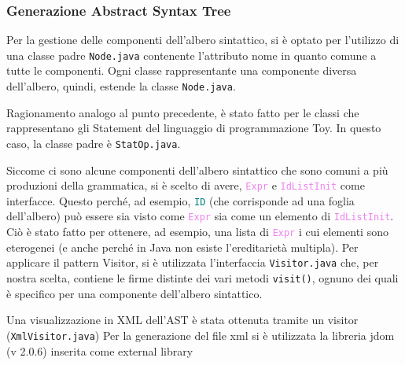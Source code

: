 \documentclass[a4paper,12pt]{article}
\newcommand\nonterm[1]{\texttt{\textcolor{violet}{#1}}}
\newcommand\term[1]{\texttt{\textcolor{teal}{#1}}}
\begin{document}
	\subsubsection{Generazione Abstract Syntax Tree}

 	Per la gestione delle componenti dell'albero sintattico, si è optato per l'utilizzo di una classe padre
	\texttt{Node.java} contenente l'attributo nome in quanto comune a tutte le componenti.
    Ogni classe rappresentante una componente diversa dell'albero, quindi, estende la classe \texttt{Node.java}.

	Ragionamento analogo al punto precedente, è stato fatto per le classi che rappresentano gli Statement del
    linguaggio di programmazione Toy. In questo caso, la classe padre è \texttt{StatOp.java}.

   Siccome ci sono alcune componenti dell'albero sintattico che sono comuni a più produzioni della grammatica,
   si è scelto di avere, \nonterm{Expr} e \nonterm{IdListInit} come interfacce. Questo perché, ad esempio, \term{ID} (che corrisponde ad
   una foglia dell'albero) può essere sia visto come \nonterm{Expr} sia come un elemento di \nonterm{IdListInit}.
   Ciò è stato fatto per ottenere, ad esempio, una lista di \nonterm{Expr} i cui elementi sono eterogenei (e anche perché in
   Java non esiste l'ereditarietà multipla).
   Per applicare il pattern Visitor, si è utilizzata l'interfaccia \texttt{Visitor.java} che, per nostra scelta,
   contiene le firme distinte dei vari metodi \texttt{visit()}, ognuno dei quali è specifico per una componente
   dell'albero sintattico.

   Una visualizzazione in XML dell'AST è stata ottenuta tramite un visitor (\texttt{XmlVisitor.java}) 
   Per la generazione del file xml si è utilizzata la libreria jdom (v 2.0.6) inserita come external library
\end{document}
